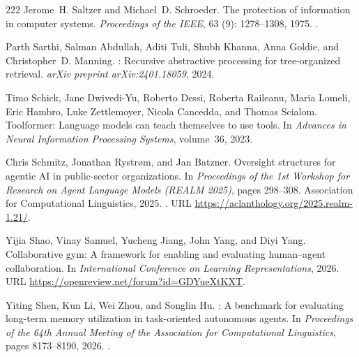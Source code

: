 \begin{thebibliography}{222}
Jerome~H. Saltzer and Michael~D. Schroeder.
\newblock The protection of information in computer systems.
\newblock \emph{Proceedings of the IEEE}, 63 (9): 1278--1308,
  1975.
\newblock {}.

Parth Sarthi, Salman Abdullah, Aditi Tuli, Shubh Khanna, Anna Goldie, and
  Christopher~D. Manning.
: Recursive abstractive processing for tree-organized
  retrieval.
\newblock \emph{arXiv preprint arXiv:2401.18059}, 2024.

Timo Schick, Jane Dwivedi-Yu, Roberto Dessi, Roberta Raileanu, Maria Lomeli,
  Eric Hambro, Luke Zettlemoyer, Nicola Cancedda, and Thomas Scialom.
\newblock Toolformer: Language models can teach themselves to use tools.
\newblock In \emph{Advances in Neural Information Processing Systems},
  volume~36, 2023.

Chris Schmitz, Jonathan Rystr{\o}m, and Jan Batzner.
\newblock Oversight structures for agentic {AI} in public-sector organizations.
\newblock In \emph{Proceedings of the 1st Workshop for Research on Agent
  Language Models (REALM 2025)}, pages 298--308. Association for Computational
  Linguistics, 2025.
\newblock {}.
\newblock URL \url{https://aclanthology.org/2025.realm-1.21/}.

Yijia Shao, Vinay Samuel, Yucheng Jiang, John Yang, and Diyi Yang.
\newblock Collaborative gym: A framework for enabling and evaluating
  human--agent collaboration.
\newblock In \emph{International Conference on Learning Representations}, 2026.
\newblock URL \url{https://openreview.net/forum?id=GDYueXtKXT}.

Yiting Shen, Kun Li, Wei Zhou, and Songlin Hu.
: A benchmark for evaluating long-term memory
  utilization in task-oriented autonomous agents.
\newblock In \emph{Proceedings of the 64th Annual Meeting of the Association
  for Computational Linguistics}, pages 8173--8190, 2026.
\newblock {}.


\end{thebibliography}
